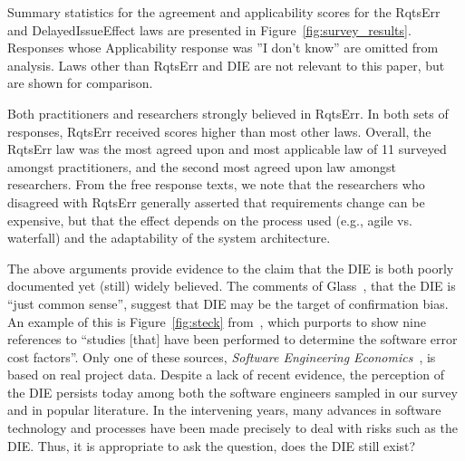 \documentclass[smallcondensed]{svjour3}
\newcommand{\fig}[1]{Figure~\ref{fig:#1}}
\begin{document}
Summary statistics for the agreement and applicability scores for the RqtsErr and DelayedIssueEffect laws are presented in Figure~\ref{fig:survey_results}. Responses whose Applicability response was ''I don't know'' are omitted from analysis. Laws other than RqtsErr and DIE are not relevant to this paper, but are shown for comparison.  


Both  practitioners and researchers strongly believed in RqtsErr. In both sets of responses, RqtsErr received  scores higher than most
other laws. Overall, the RqtsErr law was the most agreed upon and most applicable law of 11 surveyed amongst practitioners, and the second most agreed upon law amongst researchers. From the free response texts, we note that the researchers who disagreed with RqtsErr generally asserted that requirements change can be expensive, but that the effect depends on the process used (e.g., agile vs. waterfall) and the adaptability of the system architecture.

The above arguments provide evidence to the claim that the DIE is both poorly documented yet (still) widely believed. The comments of Glass~\cite{glass02}, that the DIE is ``just common sense'', suggest that DIE may be the target of confirmation bias. An example of this is \fig{steck} from~\cite{steck04}, which purports to show nine references to ``studies [that] have been performed to determine the software error cost factors''. Only one of these sources, \textit{Software Engineering Economics}~\cite{Boehm81}, is based on real project data.  Despite a lack of recent evidence, the perception of the DIE persists today among both the software engineers sampled in our survey and in popular literature. In the intervening years, many advances in software technology and processes have been made precisely to deal with risks such as the DIE. Thus, it is appropriate to ask the question, does the DIE still exist?
\end{document}
